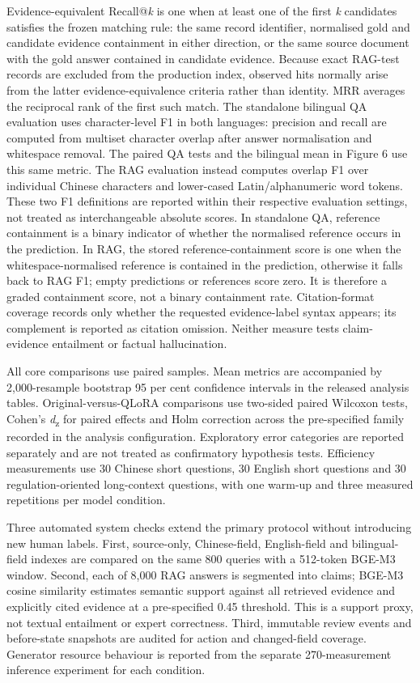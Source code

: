 Evidence-equivalent Recall@\emph{k} is one when at least one of the first \emph{k} candidates satisfies the frozen matching rule: the same record identifier, normalised gold and candidate evidence containment in either direction, or the same source document with the gold answer contained in candidate evidence. Because exact RAG-test records are excluded from the production index, observed hits normally arise from the latter evidence-equivalence criteria rather than identity. MRR averages the reciprocal rank of the first such match. The standalone bilingual QA evaluation uses character-level F1 in both languages: precision and recall are computed from multiset character overlap after answer normalisation and whitespace removal. The paired QA tests and the bilingual mean in Figure 6 use this same metric. The RAG evaluation instead computes overlap F1 over individual Chinese characters and lower-cased Latin/alphanumeric word tokens. These two F1 definitions are reported within their respective evaluation settings, not treated as interchangeable absolute scores. In standalone QA, reference containment is a binary indicator of whether the normalised reference occurs in the prediction. In RAG, the stored reference-containment score is one when the whitespace-normalised reference is contained in the prediction, otherwise it falls back to RAG F1; empty predictions or references score zero. It is therefore a graded containment score, not a binary containment rate. Citation-format coverage records only whether the requested evidence-label syntax appears; its complement is reported as citation omission. Neither measure tests claim-evidence entailment or factual hallucination.

All core comparisons use paired samples. Mean metrics are accompanied by 2,000-resample bootstrap 95 per cent confidence intervals in the released analysis tables. Original-versus-QLoRA comparisons use two-sided paired Wilcoxon tests, Cohen's \emph{d}\textsubscript{z} for paired effects and Holm correction across the pre-specified family recorded in the analysis configuration. Exploratory error categories are reported separately and are not treated as confirmatory hypothesis tests. Efficiency measurements use 30 Chinese short questions, 30 English short questions and 30 regulation-oriented long-context questions, with one warm-up and three measured repetitions per model condition.

Three automated system checks extend the primary protocol without introducing new human labels. First, source-only, Chinese-field, English-field and bilingual-field indexes are compared on the same 800 queries with a 512-token BGE-M3 window. Second, each of 8,000 RAG answers is segmented into claims; BGE-M3 cosine similarity estimates semantic support against all retrieved evidence and explicitly cited evidence at a pre-specified 0.45 threshold. This is a support proxy, not textual entailment or expert correctness. Third, immutable review events and before-state snapshots are audited for action and changed-field coverage. Generator resource behaviour is reported from the separate 270-measurement inference experiment for each condition.

